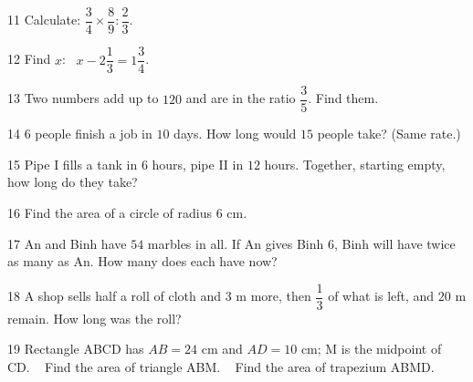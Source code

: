 \begin{probbox}{11}{\relax}
Calculate: $\dfrac34\times\dfrac89:\dfrac23$.
\end{probbox}
\gap
\begin{probbox}{12}{\relax}
Find $x$: \ $x-2\dfrac13=1\dfrac34$.
\end{probbox}
\gap
\begin{probbox}{13}{\relax}
Two numbers add up to $120$ and are in the ratio $\dfrac35$. Find them.
\end{probbox}
\gap
\begin{probbox}{14}{\relax}
$6$ people finish a job in $10$ days. How long would $15$ people take? (Same rate.)
\end{probbox}
\gap
\begin{probbox}{15}{\relax}
Pipe I fills a tank in $6$ hours, pipe II in $12$ hours. Together, starting empty, how long do they take?
\end{probbox}
\gap
\begin{probbox}{16}{\relax}
Find the area of a circle of radius $6$ cm.
\end{probbox}
\begin{probbox}{17}{}
An and Binh have $54$ marbles in all. If An gives Binh $6$, Binh will have twice as many as An. How many does each have now?
\end{probbox}
\gap
\begin{probbox}{18}{}
A shop sells half a roll of cloth and $3$ m more, then $\dfrac13$ of what is left, and $20$ m remain. How long was the roll?
\end{probbox}
\gap
\begin{probbox}{19}{}
Rectangle ABCD has $AB=24$ cm and $AD=10$ cm; M is the midpoint of CD. \  Find the area of triangle ABM. \  Find the area of trapezium ABMD.
\end{probbox}

